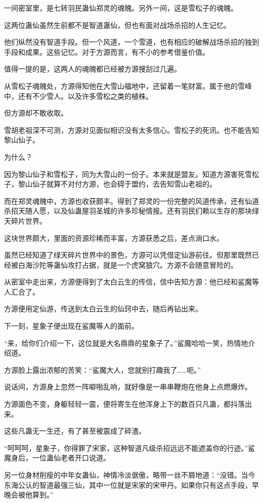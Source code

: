\begin{this_body}
一间密室里，是七转羽民蛊仙郑灵的魂魄。另外一间，这是雪松子的魂魄。

这两位蛊仙虽然生前都不是智道蛊仙，但也有面对战场杀招的人生记忆。

他们纵然没有智道手段。但一个风道，一个雪道，也有相应的破解战场杀招的独到手段和成果。这些记忆。对于方源而言，有不小的参考借鉴价值。

值得一提的是，这两人的魂魄都已经被方源搜刮过几遍。

从雪松子魂魄处，方源得知他在大雪山福地中，还留着一笔财富。属于他的雪峰中，还有不少雪人。以及许多雪松之类的植株。

但方源却不敢收取。

雪胡老祖深不可测，方源对见面似相识没有太多信心。雪松子的死讯。也不能告知黎山仙子。

为什么？

因为黎山仙子和雪松子，同为大雪山的一份子。本来就是盟友。知道方源害死雪松子，黎山仙子就算不对付方源，也会碍于盟约，去告知雪山老祖的。

而在郑灵魂魄中，方源也收获颇丰。得到了郑灵的一份完整的风道传承，还有仙道杀招天随人愿，以及仙蛊屋羽圣城的许多珍秘情报。还有羽民们赖以生存的那块绿天碎片世界。

这块世界颇大，里面的资源珍稀而丰富，方源获悉之后，差点淌口水。

虽然已经知道了绿天碎片世界中的景色，方源可以凭借定仙游前往。但那里既然已经被白海沙陀等蛊仙攻打占据，就是一个虎窝狼穴。方源不会随意冒险的。

从密室中走出来，方源便得到了太白云生的传信，信中告知方源：他已经和鲨魔等人汇合了。

方源便用定仙游，传送到太白云生的仙窍中去，随后再钻出来。

下一刻，星象子便出现在鲨魔等人的面前。

“来，给你们介绍一下，这位就是大名鼎鼎的星象子了。”鲨魔哈哈一笑，热情地介绍道。

方源脸上露出浓郁的苦笑：“鲨魔大人，您就别打趣我了……呃。”

说话间，方源身上忽然一阵噼啪乱响，就好像是一串串鞭炮在他身上点燃爆炸。

方源面色不变，身躯轻轻一震，便将寄生在他浑身上下的数百只凡蛊，都抖落出来。

这些凡蛊无一生还，有了甚至被震成了碎渣。

“呵呵呵，星象子，你得罪了宋家，这种智道凡级杀招远远不能遮盖你的行迹。”鲨魔身后，一位蛊仙老者开口说道。

另一位身材削瘦的中年女蛊仙，神情冷淡倨傲，略带一丝不屑地道：“没错。当今东海公认的智道最强三仙，其中一位就是宋家的宋甲丹。如果你只有这点手段，早晚会被他算到。”


\end{this_body}
